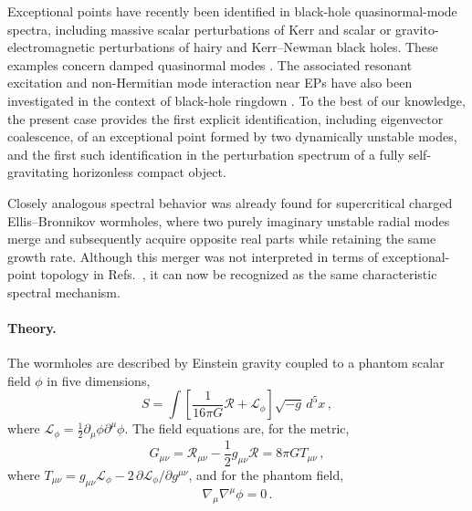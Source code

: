 \documentclass[aps,prl,reprint,superscriptaddress,nofootinbib,floatfix]{revtex4-2}
\begin{document}
Exceptional points have recently been identified in black-hole quasinormal-mode spectra, including massive scalar perturbations of Kerr and scalar or gravito-electromagnetic perturbations of hairy and Kerr–Newman black holes. 
These examples concern damped quasinormal modes \cite{Cavalcante:2024swt,Oshita:2025ibu,Cheng:2026gxu,Arcos:2026eis}. 
The associated resonant excitation and non-Hermitian mode interaction near EPs have also been investigated in the context of black-hole ringdown \cite{Motohashi:2024fwt,Yang:2025dbn,PanossoMacedo:2025xnf,Kubota:2025hjk}.
To the best of our knowledge, the present case provides the first explicit identification, including eigenvector coalescence, of an exceptional point formed by two dynamically unstable modes, and the first such identification in the perturbation spectrum of a fully self-gravitating horizonless compact object.

Closely analogous spectral behavior was already found for supercritical charged Ellis–Bronnikov wormholes, where two purely imaginary unstable radial modes merge and subsequently acquire opposite real parts while retaining the same growth rate. 
Although this merger was not interpreted in terms of exceptional-point topology in Refs.~\cite{Blazquez-Salcedo:2025dit,Blazquez-Salcedo:2026cps}, it can now be recognized as the same characteristic spectral mechanism.

\paragraph{Theory.}

The wormholes are described by Einstein gravity coupled to a phantom scalar field $\phi$ in five dimensions,
\begin{equation}
    S = \int \left[\frac{1}{16\pi G} \mathcal{R} + \mathcal{L}_{\phi} \right] 
    \sqrt{-g} \, d^5x \, ,
\end{equation}
where $\mathcal{L}_{\phi}=\frac{1}{2}\partial_{\mu}\phi\partial^{\mu}\phi$.
The field equations are, 
for the metric,
\begin{equation}
   G_{\mu\nu} = \mathcal{R}_{\mu\nu} - \frac{1}{2} g_{\mu\nu}\mathcal{R} = 8\pi GT_{\mu\nu} \, ,
   \label{meEq}
\end{equation}
where
$T_{\mu\nu}
=g_{\mu\nu}\mathcal{L}_{\phi} - 2 \, 
\partial\mathcal{L}_{\phi} / \partial g^{\mu\nu}$, and for the phantom field,
\begin{equation}
    \nabla_{\mu}\nabla^{\mu} \phi = 0\,.
    \label{scEq}
\end{equation}
\end{document}
